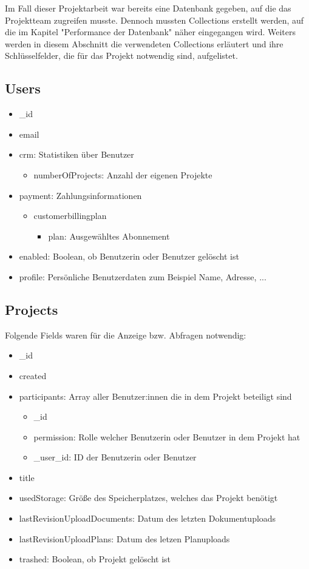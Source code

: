 Im Fall dieser Projektarbeit war bereits eine Datenbank gegeben, auf die das Projektteam zugreifen musste. Dennoch mussten Collections erstellt werden, auf die im Kapitel "Performance der Datenbank" näher eingegangen wird. Weiters werden in diesem Abschnitt die verwendeten Collections erläutert und ihre Schlüsselfelder, die für das Projekt notwendig sind, aufgelistet.
\subsection{Users}
\begin{itemize}
    \item \_id
    \item email
    \item crm: Statistiken über Benutzer
        \begin{itemize}
            \item numberOfProjects: Anzahl der eigenen Projekte
        \end{itemize}
    \item payment: Zahlungsinformationen
        \begin{itemize}
            \item customerbillingplan
            \begin{itemize}
                \item plan: Ausgewähltes Abonnement
            \end{itemize}
        \end{itemize}
    \item enabled: Boolean, ob Benutzerin oder Benutzer gelöscht ist
    \item profile: Persönliche Benutzerdaten zum Beispiel Name, Adresse, ...
\end{itemize}

\subsection{Projects}
Folgende Fields waren für die Anzeige bzw. Abfragen notwendig:
\begin{itemize}
    \item \_id
    \item created
    \item participants: Array aller Benutzer:innen die in dem Projekt beteiligt sind
        \begin{itemize}
            \item \_id
            \item permission: Rolle welcher Benutzerin oder Benutzer in dem Projekt hat
            \item \_user\_id: ID der Benutzerin oder Benutzer
        \end{itemize}
    \item title
    \item usedStorage: Größe des Speicherplatzes, welches das Projekt benötigt
    \item lastRevisionUploadDocuments: Datum des letzten Dokumentuploads
    \item lastRevisionUploadPlans: Datum des letzen Planuploads
    \item trashed: Boolean, ob Projekt gelöscht ist
\end{itemize}